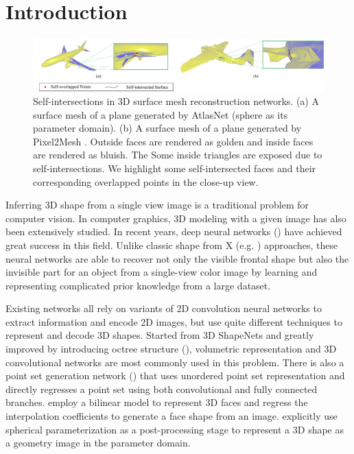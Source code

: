 \section{Introduction}
\begin{figure}[htbp]
	\centering
	\includegraphics[width=\linewidth]{img/issue/issue}
	\caption{Self-intersections in 3D surface mesh reconstruction networks. (a) A surface mesh of a plane generated by AtlasNet \cite{atlasnet} (sphere as its parameter domain). (b) A surface mesh of a plane generated by Pixel2Mesh \cite{pixel2mesh}. Outside faces are rendered as golden and inside faces are rendered as bluish. The Some inside triangles are exposed due to self-intersections. We highlight some self-intersected faces and their corresponding overlapped points in the close-up view.}
	\label{fig:issue}
\end{figure}
Inferring 3D shape from a single view image is a traditional problem for computer vision. In computer graphics, 3D modeling with a given image has also been extensively studied. In recent years, deep neural networks (\cite{3DR2N2,PSGN,3Drender,imgrecon15,3dshapenet,endface,octreegen,surfnet,shapeprior}) have achieved great success in this field. Unlike classic shape from X (e.g. \cite{shapefromshading,shapefromtext1,shapefromtext2}) approaches, these neural networks are able to recover not only the visible frontal shape but also the invisible part for an object from a single-view color image by learning and representing complicated prior knowledge from a large dataset. 

Existing networks all rely on variants of 2D convolution neural networks to extract information and encode 2D images, but use quite different techniques to represent and decode 3D shapes. Started from 3D ShapeNets \cite{3dshapenet} and greatly improved by introducing octree structure (\cite{octreegen}), volumetric representation and 3D convolutional networks are most commonly used in this problem. There is also a point set generation network (\cite{PSGN}) that uses unordered point set representation and directly regresses a point set using both convolutional and fully connected branches. \cite{endface} employ a bilinear model to represent 3D faces and regress the interpolation coefficients to generate a face shape from an image. \cite{surfnet} explicitly use spherical parameterization as a post-processing stage to represent a 3D shape as a geometry image in the parameter domain. 

